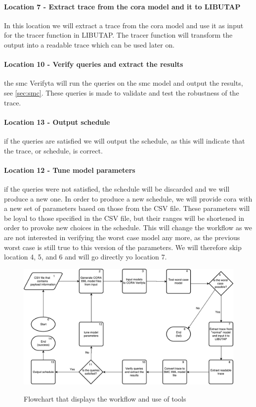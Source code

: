 \paragraph{Location 7 - Extract trace from the \gls{cora} model and it to LIBUTAP}
In this location we will extract a trace from the \gls{cora} model and use it as input for the tracer function in LIBUTAP. The tracer function will transform the output into a readable trace which can be used later on.


\paragraph{Location 10 - Verify queries and extract the results} the \gls{smc} Verifyta will run the queries on the \gls{smc} model and output the results, see \cref{sec:smc}. These queries is made to validate and test the robustness of the trace.

\paragraph{Location 13 - Output schedule} if the queries are satisfied we will output the schedule, as this will indicate that the trace, or schedule, is correct.

\paragraph{Location 12 - Tune model parameters} if the queries were not satisfied, the schedule will be discarded and we will produce a new one. In order to produce a new schedule, we will provide \gls{cora} with a new set of parameters based on those from the CSV file. These parameters will be loyal to those specified in the CSV file, but their ranges will be shortened in order to provoke new choices in the schedule. This will change the workflow as we are not interested in verifying the worst case model any more, as the previous worst case is still true to this version of the parameters. We will therefore skip location 4, 5, and 6 and will go directly yo location 7.

\begin{figure}[h]
	\includegraphics[width=\textwidth]{graphics/tool_chain.pdf}
	\label{fig:tool3}
	\caption{Flowchart that displays the workflow and use of tools}
\end{figure}
